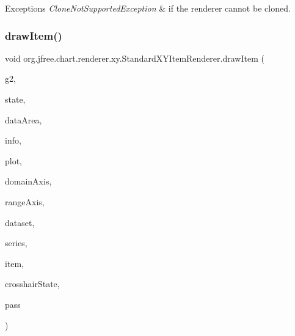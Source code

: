 \begin{DoxyExceptions}{Exceptions}
{\em Clone\+Not\+Supported\+Exception} & if the renderer cannot be cloned. \\
\hline
\end{DoxyExceptions}
\mbox{\label{classorg_1_1jfree_1_1chart_1_1renderer_1_1xy_1_1_standard_x_y_item_renderer_af4178cc4c14c973aac8e423baa757293}} 
\subsubsection{\texorpdfstring{draw\+Item()}{drawItem()}}
{\footnotesize\ttfamily void org.\+jfree.\+chart.\+renderer.\+xy.\+Standard\+X\+Y\+Item\+Renderer.\+draw\+Item (\begin{DoxyParamCaption}\item[{Graphics2D}]{g2,  }\item[{\mbox{\hyperlink{classorg_1_1jfree_1_1chart_1_1renderer_1_1xy_1_1_x_y_item_renderer_state}{X\+Y\+Item\+Renderer\+State}}}]{state,  }\item[{Rectangle2D}]{data\+Area,  }\item[{\mbox{\hyperlink{classorg_1_1jfree_1_1chart_1_1plot_1_1_plot_rendering_info}{Plot\+Rendering\+Info}}}]{info,  }\item[{\mbox{\hyperlink{classorg_1_1jfree_1_1chart_1_1plot_1_1_x_y_plot}{X\+Y\+Plot}}}]{plot,  }\item[{\mbox{\hyperlink{classorg_1_1jfree_1_1chart_1_1axis_1_1_value_axis}{Value\+Axis}}}]{domain\+Axis,  }\item[{\mbox{\hyperlink{classorg_1_1jfree_1_1chart_1_1axis_1_1_value_axis}{Value\+Axis}}}]{range\+Axis,  }\item[{\mbox{\hyperlink{interfaceorg_1_1jfree_1_1data_1_1xy_1_1_x_y_dataset}{X\+Y\+Dataset}}}]{dataset,  }\item[{int}]{series,  }\item[{int}]{item,  }\item[{\mbox{\hyperlink{classorg_1_1jfree_1_1chart_1_1plot_1_1_crosshair_state}{Crosshair\+State}}}]{crosshair\+State,  }\item[{int}]{pass }\end{DoxyParamCaption})}

